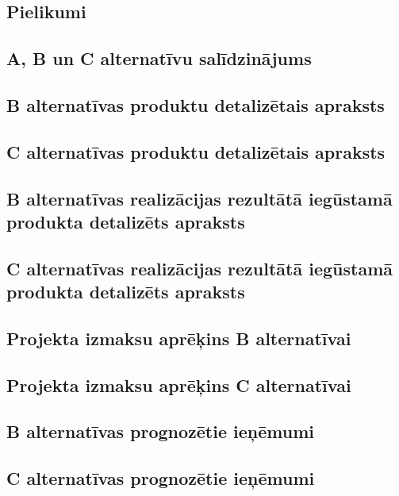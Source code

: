 \begin{appendices}
    \chapter{Pielikumi}
    \section{A, B un C alternatīvu salīdzinājums}
    \label{app:pielikums1}
        \clearpage
    \section{B alternatīvas produktu detalizētais apraksts}
    \label{app:pielikums2}
        \clearpage
    \section{C alternatīvas produktu detalizētais apraksts}
    \label{app:pielikums3}
        \clearpage
    \section{B alternatīvas realizācijas rezultātā iegūstamā produkta detalizēts apraksts}
    \label{app:pielikums4}
        \clearpage
    \section{C alternatīvas realizācijas rezultātā iegūstamā produkta detalizēts apraksts}
    \label{app:pielikums5}
        \clearpage
    \section{Projekta izmaksu aprēķins B alternatīvai}
    \label{app:pielikums6}
        \clearpage
    \section{Projekta izmaksu aprēķins C alternatīvai}
    \label{app:pielikums7}
        \clearpage
    \section{B alternatīvas prognozētie ieņēmumi}
    \label{app:pielikums8}
        \clearpage
    \section{C alternatīvas prognozētie ieņēmumi}
    \label{app:pielikums9}
        \clearpage

\end{appendices}
